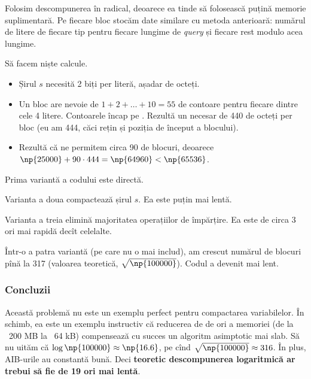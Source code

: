 Folosim descompunerea în radical, deoarece ea tinde să folosească puțină memorie suplimentară. Pe fiecare bloc stocăm date similare cu metoda anterioară: numărul de litere de fiecare tip pentru fiecare lungime de \textit{query} și fiecare rest modulo acea lungime.

Să facem niște calcule.

\begin{itemize}
  \item Șirul $s$ necesită 2 biți per literă, așadar  de octeți.

  \item Un bloc are nevoie de $1 + 2 + \dots + 10 = 55$ de contoare pentru fiecare dintre cele 4 litere. Contoarele încap pe . Rezultă un necesar de 440 de octeți per bloc (eu am 444, căci rețin și poziția de început a blocului).

  \item Rezultă că ne permitem circa 90 de blocuri, deoarece $\np{25000} + 90 \cdot 444 = \np{64960} < \np{65536}$.
\end{itemize}

Prima variantă a codului este directă.

Varianta a doua compactează șirul $s$. Ea este puțin mai lentă.

Varianta a treia elimină majoritatea operațiilor de împărțire. Ea este de circa 3 ori mai rapidă decît celelalte.

Într-o a patra variantă (pe care nu o mai includ), am crescut numărul de blocuri pînă la 317 (valoarea teoretică, $\sqrt{\np{100000}}$). Codul a devenit mai lent.

\subsubsection*{Concluzii}

Această problemă nu este un exemplu perfect pentru compactarea variabilelor. În schimb, ea este un exemplu instructiv că reducerea de  de ori a memoriei (de la ~200 MB la ~64 kB) compensează cu succes un algoritm asimptotic mai slab. Să nu uităm că $\log \np{100000} \approx \np{16.6}$, pe cînd $\sqrt{\np{100000}} \approx 316$. În plus, AIB-urile au constantă bună. Deci \textbf{teoretic descompunerea logaritmică ar trebui să fie de 19 ori mai lentă}.
